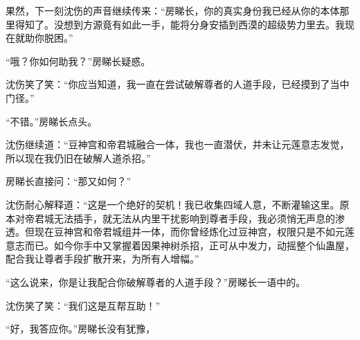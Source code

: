 \begin{this_body}
果然，下一刻沈伤的声音继续传来：“房睇长，你的真实身份我已经从你的本体那里得知了。没想到方源竟有如此一手，能将分身安插到西漠的超级势力里去。我现在就助你脱困。”

“哦？你如何助我？”房睇长疑惑。

沈伤笑了笑：“你应当知道，我一直在尝试破解尊者的人道手段，已经摸到了当中门径。”

“不错。”房睇长点头。

沈伤继续道：“豆神宫和帝君城融合一体，我也一直潜伏，并未让元莲意志发觉，所以现在我仍旧在破解人道杀招。”

房睇长直接问：“那又如何？”

沈伤耐心解释道：“这是一个绝好的契机！我已收集四域人意，不断灌输这里。原本对帝君城无法插手，就无法从内里干扰影响到尊者手段，我必须悄无声息的渗透。但现在豆神宫和帝君城组并一体，而你曾经炼化过豆神宫，权限只是不如元莲意志而已。如今你手中又掌握着因果神树杀招，正可从中发力，动摇整个仙蛊屋，配合我让尊者手段扩散开来，为所有人增幅。”

“这么说来，你是让我配合你破解尊者的人道手段？”房睇长一语中的。

沈伤笑了笑：“我们这是互帮互助！”

“好，我答应你。”房睇长没有犹豫，

\end{this_body}

